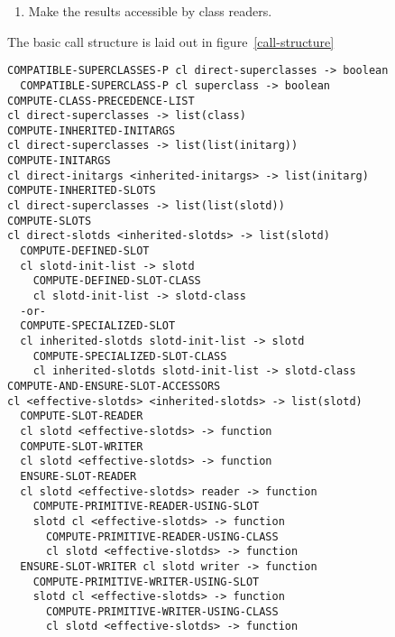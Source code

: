 \begin{optDefinition}
\begin{enumerate}
    \item Make the results accessible by class readers.
\end{enumerate}
%
The basic call structure is laid out in figure~\ref{call-structure}
%
\begin{optPrivate}
\begin{verbatim}
COMPATIBLE-SUPERCLASSES-P cl direct-superclasses -> boolean
  COMPATIBLE-SUPERCLASS-P cl superclass -> boolean
COMPUTE-CLASS-PRECEDENCE-LIST
cl direct-superclasses -> list(class)
COMPUTE-INHERITED-INITARGS
cl direct-superclasses -> list(list(initarg))
COMPUTE-INITARGS
cl direct-initargs <inherited-initargs> -> list(initarg)
COMPUTE-INHERITED-SLOTS
cl direct-superclasses -> list(list(slotd))
COMPUTE-SLOTS
cl direct-slotds <inherited-slotds> -> list(slotd)
  COMPUTE-DEFINED-SLOT
  cl slotd-init-list -> slotd
    COMPUTE-DEFINED-SLOT-CLASS
    cl slotd-init-list -> slotd-class
  -or-
  COMPUTE-SPECIALIZED-SLOT
  cl inherited-slotds slotd-init-list -> slotd
    COMPUTE-SPECIALIZED-SLOT-CLASS
    cl inherited-slotds slotd-init-list -> slotd-class
COMPUTE-AND-ENSURE-SLOT-ACCESSORS
cl <effective-slotds> <inherited-slotds> -> list(slotd)
  COMPUTE-SLOT-READER
  cl slotd <effective-slotds> -> function
  COMPUTE-SLOT-WRITER
  cl slotd <effective-slotds> -> function
  ENSURE-SLOT-READER
  cl slotd <effective-slotds> reader -> function
    COMPUTE-PRIMITIVE-READER-USING-SLOT
    slotd cl <effective-slotds> -> function
      COMPUTE-PRIMITIVE-READER-USING-CLASS
      cl slotd <effective-slotds> -> function
  ENSURE-SLOT-WRITER cl slotd writer -> function
    COMPUTE-PRIMITIVE-WRITER-USING-SLOT
    slotd cl <effective-slotds> -> function
      COMPUTE-PRIMITIVE-WRITER-USING-CLASS
      cl slotd <effective-slotds> -> function
\end{verbatim}
\end{optPrivate}


\end{optDefinition}
